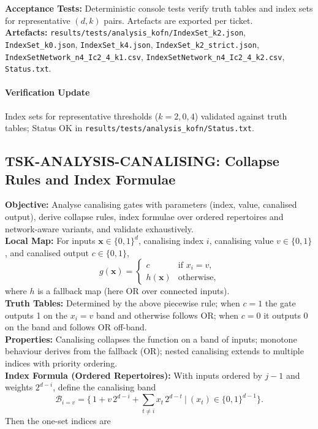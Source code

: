 \documentclass[11pt]{article}
\begin{document}
\textbf{Acceptance Tests:} Deterministic console tests verify truth tables and index sets for representative \((d,k)\) pairs. Artefacts are exported per ticket.\\
\textbf{Artefacts:} \texttt{results/tests/analysis\_kofn/IndexSet\_k2.json}, \texttt{IndexSet\_k0.json}, \texttt{IndexSet\_k4.json}, \texttt{IndexSet\_k2\_strict.json}, \texttt{IndexSetNetwork\_n4\_Ic2\_4\_k1.csv}, \texttt{IndexSetNetwork\_n4\_Ic2\_4\_k2.csv}, \texttt{Status.txt}.
\paragraph{Verification Update} Index sets for representative thresholds (\(k=2,0,4\)) validated against truth tables; Status OK in \texttt{results/tests/analysis\_kofn/Status.txt}.
\subsection{TSK-ANALYSIS-CANALISING: Collapse Rules and Index Formulae}
\textbf{Objective:} Analyse canalising gates with parameters (index, value, canalised output), derive collapse rules, index formulae over ordered repertoires and network-aware variants, and validate exhaustively.\\
\textbf{Local Map:} For inputs \(\mathbf{x}\in\{0,1\}^d\), canalising index \(i\), canalising value \(v\in\{0,1\}\), and canalised output \(c\in\{0,1\}\),
\[
g(\mathbf{x}) = \begin{cases}
 c & \text{if } x_i = v,\\
 h(\mathbf{x}) & \text{otherwise,}
\end{cases}
\]
where \(h\) is a fallback map (here \(\mathrm{OR}\) over connected inputs).\\
\textbf{Truth Tables:} Determined by the above piecewise rule; when \(c=1\) the gate outputs 1 on the \(x_i=v\) band and otherwise follows \(\mathrm{OR}\); when \(c=0\) it outputs 0 on the band and follows \(\mathrm{OR}\) off-band.\\
\textbf{Properties:} Canalising collapses the function on a band of inputs; monotone behaviour derives from the fallback (\(\mathrm{OR}\)); nested canalising extends to multiple indices with priority ordering.\\
\textbf{Index Formula (Ordered Repertoires):} With inputs ordered by \(j-1\) and weights \(2^{d-i}\), define the canalising band
\[
\mathcal{B}_{i=v} = \Big\{\, 1 + v\,2^{d-i} + \sum_{t\ne i} x_t\,2^{d-t} \ \Big| \ (x_t)\in\{0,1\}^{d-1} \Big\}.
\]
Then the one-set indices are
\end{document}
